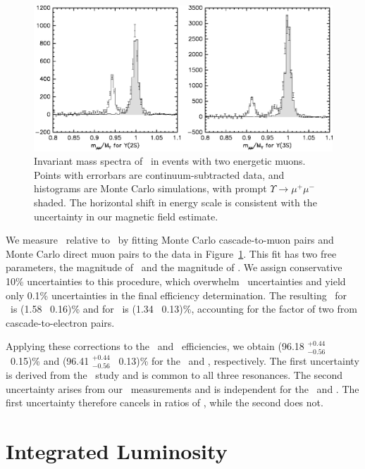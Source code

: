 \documentclass{cornell}
\begin{document}
\begin{figure}[p]
  \begin{center}
    \includegraphics[width=\linewidth]{invariantmumass}
  \end{center}
  \caption[Determining ${\mathcal B}_\subs{cas}$ from \mumu\ invariant
  mass in \uss\ and \usss]{\label{invariantmumass} Invariant mass
  spectra of \mumu\ in events with two energetic muons.  Points with
  errorbars are continuum-subtracted data, and histograms are Monte
  Carlo simulations, with prompt $\Upsilon \to \mu^+\mu^-$ shaded.
  The horizontal shift in energy scale is consistent with the
  uncertainty in our magnetic field estimate.}
\end{figure}

We measure \bcas\ relative to \bmm\ by fitting Monte Carlo
cascade-to-muon pairs and Monte Carlo direct muon pairs to the data in
Figure~\ref{invariantmumass}.  This fit has two free parameters, the
magnitude of \bcas\ and the magnitude of \bmm.  We assign conservative
10\% uncertainties to this procedure, which overwhelm \bmm\
uncertainties and yield only 0.1\% uncertainties in the final
efficiency determination.  The resulting \bcas\ for \uss\ is (1.58
\PM\ 0.16)\% and for \usss\ is (1.34 \PM\ 0.13)\%, accounting for the
factor of two from cascade-to-electron pairs.

Applying these corrections to the \uss\ and \usss\ efficiencies, we
obtain (96.18 $^{+0.44}_{-0.56}$ \PM\ 0.15)\% and (96.41
$^{+0.44}_{-0.56}$ \PM\ 0.13)\% for the \uss\ and \usss, respectively.
The first uncertainty is derived from the \twotoone\ study and is
common to all three resonances.  The second uncertainty arises from
our \bcas\ measurements and is independent for the \uss\ and \usss.
The first uncertainty therefore cancels in ratios of \gee, while the
second does not.

\chapter{Integrated Luminosity}
\label{chp:luminosity}
\end{document}
